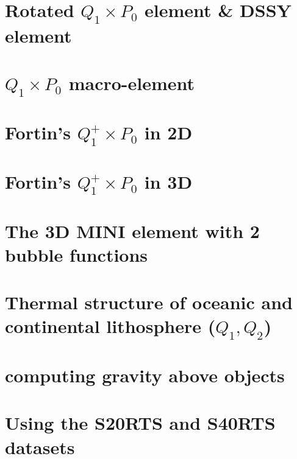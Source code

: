 \documentclass[a4paper,11pt]{report}
\begin{document}
\chapter{Rotated $Q_1\times P_0$ element \& DSSY element \label{f77}}

\chapter{$Q_1\times P_0$ macro-element \label{f78}}

\chapter{Fortin's $Q_1^+\times P_0$ in 2D \label{f80}}

\chapter{Fortin's $Q_1^+\times P_0$ in 3D \label{f81}}

\chapter{The 3D MINI element with 2 bubble functions \label{f82}}

\chapter{Thermal structure of oceanic and continental lithosphere ($Q_1,Q_2$)\label{f83}}

\chapter{computing gravity above objects \label{f84}}

\chapter{Using the S20RTS and S40RTS datasets \label{f85}}
\end{document}
